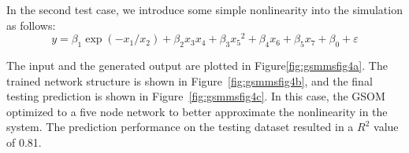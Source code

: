 \documentclass[review,3p]{elsarticle}
\renewcommand\[{\begin{equation}}
\renewcommand\]{\end{equation}}
\begin{document}
In the second test case, we introduce some simple nonlinearity into the simulation as follows:
\[y = {\beta _1}\exp \left( { - {x_1}/{x_2}} \right) + {\beta _2}{x_3}{x_4} + {\beta _3}{x_5}^2 + {\beta _4}{x_6} + {\beta _5}{x_7} + {\beta _0} + \varepsilon \]

The input and the generated output are plotted in Figure\ref{fig:gsmmsfig4a}.
The trained network structure is shown in Figure~\ref{fig:gsmmsfig4b}, and
the final testing prediction is shown in Figure~\ref{fig:gsmmsfig4c}.
In this case, the GSOM optimized to a five node network to better
approximate the nonlinearity in the system. The prediction performance on the
testing dataset resulted in a $R^2$ value of 0.81.

\begin{figure}[htpb]
  \centering
\end{figure}
\end{document}
